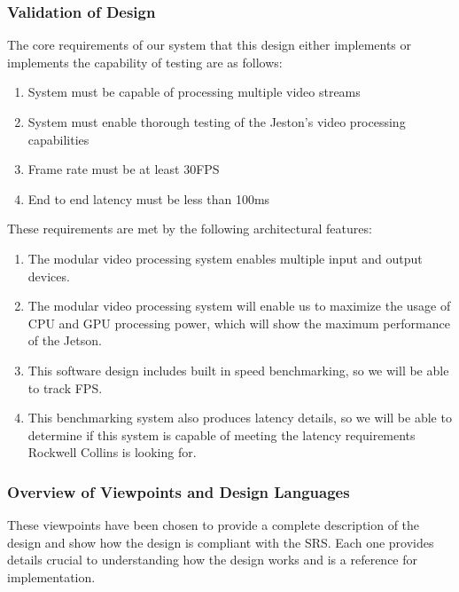 \subsubsection{Validation of Design}
The core requirements of our system that this design either implements or implements the
capability of testing are as follows:\\
\begin{enumerate}[leftmargin=2cm,labelindent=2cm]
\item System must be capable of processing multiple video streams
\item System must enable thorough testing of the Jeston's video processing capabilities
\item Frame rate must be at least 30FPS
\item End to end latency must be less than 100ms\\
\end{enumerate}

These requirements are met by the following architectural features:\\
\begin{enumerate}[leftmargin=2cm,labelindent=2cm]
\item The modular video processing system enables multiple input and output devices.
\item The modular video processing system will enable us to maximize the usage of CPU and GPU
processing power, which will show the maximum performance of the Jetson.
\item This software design includes built in speed benchmarking, so we will be able to track FPS.
\item This benchmarking system also produces latency details, so we will be able to determine if this
system is capable of meeting the latency requirements Rockwell Collins is looking for.\\
\end{enumerate}

\subsubsection{Overview of Viewpoints and Design Languages}
These viewpoints have been chosen to provide a complete description of the design and show
how the design is compliant with the SRS. Each one provides details crucial to understanding how the
design works and is a reference for implementation.\\

